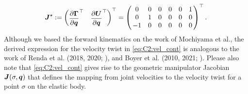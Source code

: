 %
\begin{align}
\renewcommand*{\arraystretch}{1}{}
\JB^\star := \begin{pmatrix}\dfrac{\p \GammaB}{\p \q}^\top & \dfrac{\p \UB}{\p \q}^\top \end{pmatrix}^\top  = \begin{pmatrix}
\,0 & 0 & 0 & 0 & 0 & 1 \, \\
\,0 & 1 & 0 & 0 & 0 & 0 \,  \\
\,-1 & 0 & 0 & 0 & 0 & 0 \,  \\
\end{pmatrix}^\top. \label{eq:C2:joint-axis-matrix}
\end{align}
%
Although we based the forward kinematics on the work of Mochiyama et al.\cite{Mochiyama2003}, the derived expression for the velocity twist in \eqref{eq:C2:vel_cont} is analogous to the work of Renda et al. (2018, 2020; \cite{Renda2018,Renda2020}), and Boyer et al. (2010, 2021; \cite{Boyer2010,Boyer2021}). Please also note that
\eqref{eq:C2:vel_cont} gives rise to the geometric manipulator Jacobian ${\boldsymbol{J}}(\sigma,{\boldsymbol{q}})$ that defines the mapping from joint velocities to the velocity twist for a point $\sigma$ on the elastic body.


